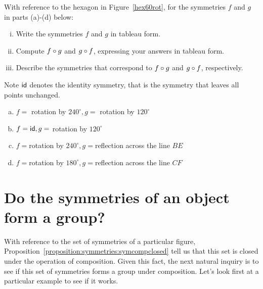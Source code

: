 \begin{exercise}{16}
With reference to the hexagon in Figure~\ref{hex60rot}, for the symmetries $f$ and $g$ in parts (a)-(d) below:
\begin{enumerate}[(i)]
\item
Write the symmetries $f$ and $g$ in tableau form.
\item
Compute $f \circ g$ and $g \circ f$, expressing your answers in tableau form.
\item 
Describe the symmetries that correspond to $f \circ g$ and $g \circ f$, respectively.
\end{enumerate}
\medskip

\noindent
Note ${\sf{i}d}$ denotes the identity symmetry, that is the symmetry that leaves all points unchanged.
\medskip

\begin{enumerate}[(a)]
\item
$f=$ rotation by $240^\circ, g=$ rotation by $120^\circ$
\item
$f={\sf{i}d}, g=$ rotation by $120^\circ$
\item
$f=$rotation by $ 240^\circ, g=$reflection across the line $BE$
\item 
$f=$rotation by $ 180^\circ, g=$reflection across the line $CF$
\end{enumerate}
\end{exercise}

\section{Do the symmetries of an object form a group?}\label{SymmetryGroup}

With reference to the set of symmetries of a particular figure,  Proposition~\ref{proposition:symmetries:symcompclosed} tell us that this set is closed under the operation of composition. Given this fact, the next natural inquiry is to see if this set of symmetries forms a group under composition.  Let's look first at a particular example to see if it works.


